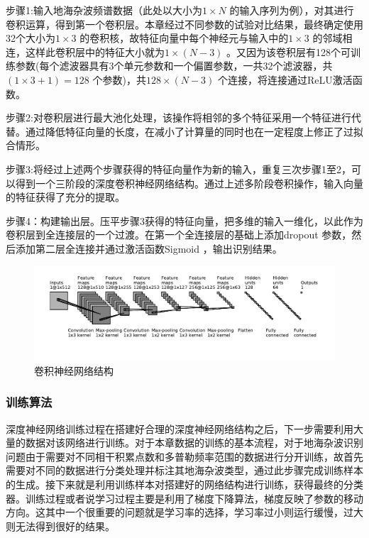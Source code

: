步骤1:输入地海杂波频谱数据（此处以大小为$1\times N$ 的输入序列为例），对其进行卷积运算，得到第一个卷积层。本章经过不同参数的试验对比结果，最终确定使用32个大小为$1\times 3$ 的卷积核，故特征向量中每个神经元与输入中的$1\times 3$ 的邻域相连，这样此卷积层中的特征大小就为$1\times (N-3)$ 。又因为该卷积层有128个可训练参数(每个滤波器具有3个单元参数和一个偏置参数，一共32个滤波器，共$(1\times 3 + 1) = 128$ 个参数)，共$128\times(N-3)$ 个连接，将连接通过ReLU激活函数。

步骤2:对卷积层进行最大池化处理，该操作将相邻的多个特征采用一个特征进行代替。通过降低特征向量的长度，在减小了计算量的同时也在一定程度上修正了过拟合情形。

步骤3:将经过上述两个步骤获得的特征向量作为新的输入，重复三次步骤1至2，可以得到一个三阶段的深度卷积神经网络结构。通过上述多阶段卷积操作，输入向量的特征获得了充分的提取。

步骤4：构建输出层。压平步骤3获得的特征向量，把多维的输入一维化，以此作为卷积层到全连接层的一个过渡。在第一个全连接层的基础上添加dropout 参数，然后添加第二层全连接并通过激活函数Sigmoid ，输出识别结果。

\begin{figure}[H]
	\centering
	\includegraphics[width=\textwidth]{figures/othr/struct}
	\caption{卷积神经网络结构}
	\label{fig:struct}
\end{figure}

\subsubsection{训练算法}

深度神经网络训练过程在搭建好合理的深度神经网络结构之后，下一步需要利用大量的数据对该网络进行训练。对于本章数据的训练的基本流程，对于地海杂波识别问题由于需要对不同相干积累点数和多普勒频率范围的数据进行分开训练，故首先需要对不同的数据进行分类处理并标注其地海杂波类型，通过此步骤完成训练样本的生成。接下来就是利用训练样本对搭建好的网络结构进行训练，获得最终的分类器。训练过程或者说学习过程主要是利用了梯度下降算法，梯度反映了参数的移动方向。这其中一个很重要的问题就是学习率的选择，学习率过小则运行缓慢，过大则无法得到很好的结果。

